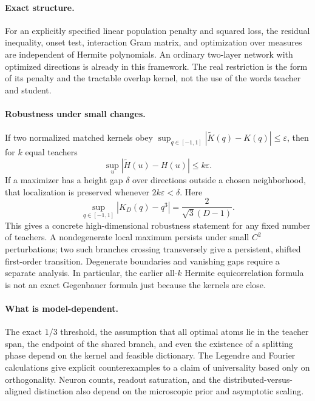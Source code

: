 \documentclass[11pt]{article}
\theoremstyle{remark}
\begin{document}
\paragraph{Exact structure.}
For an explicitly specified linear population penalty and squared loss,
the residual inequality, onset test, interaction Gram matrix, and
optimization over measures are independent of Hermite polynomials.
An ordinary two-layer network with optimized directions is already in this
framework. The real restriction is the form of its penalty and the tractable
overlap kernel, not the use of the words teacher and student.

\paragraph{Robustness under small changes.}
If two normalized matched kernels obey
$\sup_{q\in[-1,1]}|\widetilde K(q)-K(q)|\leq\varepsilon$, then for
$k$ equal teachers
\begin{equation}
 \sup_u|\widetilde H(u)-H(u)|\leq k\varepsilon.
\end{equation}
If a maximizer has a height gap $\delta$ over directions outside a chosen
neighborhood, that localization is preserved whenever
$2k\varepsilon<\delta$. Here
\begin{equation}
 \sup_{q\in[-1,1]}|K_D(q)-q^3|
      =\frac{2}{\sqrt3(D-1)}.
\end{equation}
This gives a concrete high-dimensional robustness statement for any fixed
number of teachers. A nondegenerate local maximum persists under small
$C^2$ perturbations; two such branches crossing transversely give a
persistent, shifted first-order transition. Degenerate boundaries and
vanishing gaps require a separate analysis. In particular, the earlier
all-$k$ Hermite equicorrelation formula is not an exact Gegenbauer formula
just because the kernels are close.

\paragraph{What is model-dependent.}
The exact $1/3$ threshold, the assumption that all optimal atoms lie in the
teacher span, the endpoint of the shared branch, and even the existence of
a splitting phase depend on the kernel and feasible dictionary. The
Legendre and Fourier calculations give explicit counterexamples to a claim
of universality based only on orthogonality. Neuron counts, readout
saturation, and the distributed-versus-aligned distinction also depend on
the microscopic prior and asymptotic scaling.
\end{document}
